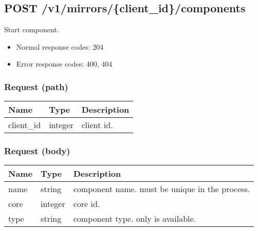 \documentclass[a4paper,11pt,openany,oneside,english]{sphinxmanual}
\begin{document}
\subsection{POST /v1/mirrors/\{client\_id\}/components}
\label{\detokenize{api_ref/spp_mirror:post-v1-mirrors-client-id-components}}
Start component.
\begin{itemize}
\item {} 
Normal response codes: 204

\item {} 
Error response codes: 400, 404

\end{itemize}


\subsubsection{Request (path)}
\label{\detokenize{api_ref/spp_mirror:id1}}

\begin{savenotes}\sphinxattablestart
\centering
{}
\sphinxthecaptionisattop
{}\label{\detokenize{api_ref/spp_mirror:id18}}\label{\detokenize{api_ref/spp_mirror:table-spp-ctl-spp-mirror-components}}
\sphinxaftertopcaption
\begin{tabulary}{\linewidth}[t]{|T|T|T|}
\hline
\sphinxstyletheadfamily 
Name
&\sphinxstyletheadfamily 
Type
&\sphinxstyletheadfamily 
Description
\\
\hline
client\_id
&
integer
&
client id.
\\
\hline
\end{tabulary}
\par
\sphinxattableend\end{savenotes}


\subsubsection{Request (body)}
\label{\detokenize{api_ref/spp_mirror:request-body}}

\begin{savenotes}\sphinxattablestart
\centering
{}
\sphinxthecaptionisattop
{}\label{\detokenize{api_ref/spp_mirror:id19}}\label{\detokenize{api_ref/spp_mirror:table-spp-ctl-spp-mirror-components-res}}
\sphinxaftertopcaption
\begin{tabulary}{\linewidth}[t]{|T|T|T|}
\hline
\sphinxstyletheadfamily 
Name
&\sphinxstyletheadfamily 
Type
&\sphinxstyletheadfamily 
Description
\\
\hline
name
&
string
&
component name. must be unique in the process.
\\
\hline
core
&
integer
&
core id.
\\
\hline
type
&
string
&
component type. only  is available.
\\
\hline
\end{tabulary}
\par
\sphinxattableend\end{savenotes}
\end{document}
